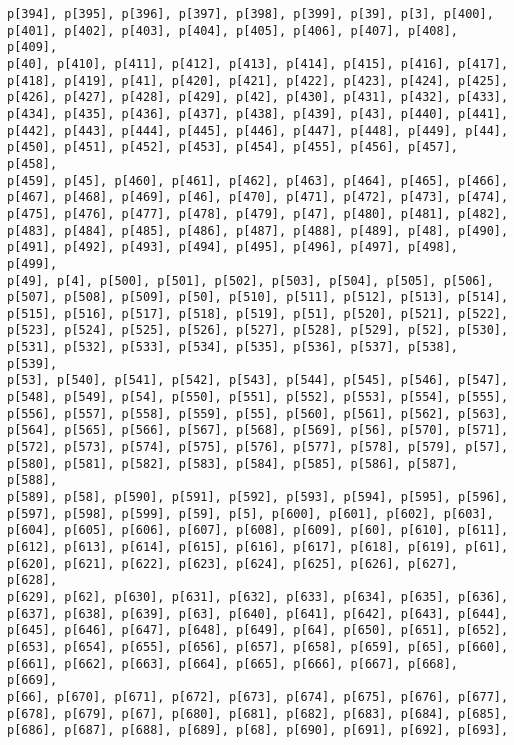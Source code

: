 \documentclass[
  letterpaper,
  DIV=11,
  numbers=noendperiod]{scrartcl}
\begin{document}
\begin{verbatim}
p[394], p[395], p[396], p[397], p[398], p[399], p[39], p[3], p[400],
p[401], p[402], p[403], p[404], p[405], p[406], p[407], p[408], p[409],
p[40], p[410], p[411], p[412], p[413], p[414], p[415], p[416], p[417],
p[418], p[419], p[41], p[420], p[421], p[422], p[423], p[424], p[425],
p[426], p[427], p[428], p[429], p[42], p[430], p[431], p[432], p[433],
p[434], p[435], p[436], p[437], p[438], p[439], p[43], p[440], p[441],
p[442], p[443], p[444], p[445], p[446], p[447], p[448], p[449], p[44],
p[450], p[451], p[452], p[453], p[454], p[455], p[456], p[457], p[458],
p[459], p[45], p[460], p[461], p[462], p[463], p[464], p[465], p[466],
p[467], p[468], p[469], p[46], p[470], p[471], p[472], p[473], p[474],
p[475], p[476], p[477], p[478], p[479], p[47], p[480], p[481], p[482],
p[483], p[484], p[485], p[486], p[487], p[488], p[489], p[48], p[490],
p[491], p[492], p[493], p[494], p[495], p[496], p[497], p[498], p[499],
p[49], p[4], p[500], p[501], p[502], p[503], p[504], p[505], p[506],
p[507], p[508], p[509], p[50], p[510], p[511], p[512], p[513], p[514],
p[515], p[516], p[517], p[518], p[519], p[51], p[520], p[521], p[522],
p[523], p[524], p[525], p[526], p[527], p[528], p[529], p[52], p[530],
p[531], p[532], p[533], p[534], p[535], p[536], p[537], p[538], p[539],
p[53], p[540], p[541], p[542], p[543], p[544], p[545], p[546], p[547],
p[548], p[549], p[54], p[550], p[551], p[552], p[553], p[554], p[555],
p[556], p[557], p[558], p[559], p[55], p[560], p[561], p[562], p[563],
p[564], p[565], p[566], p[567], p[568], p[569], p[56], p[570], p[571],
p[572], p[573], p[574], p[575], p[576], p[577], p[578], p[579], p[57],
p[580], p[581], p[582], p[583], p[584], p[585], p[586], p[587], p[588],
p[589], p[58], p[590], p[591], p[592], p[593], p[594], p[595], p[596],
p[597], p[598], p[599], p[59], p[5], p[600], p[601], p[602], p[603],
p[604], p[605], p[606], p[607], p[608], p[609], p[60], p[610], p[611],
p[612], p[613], p[614], p[615], p[616], p[617], p[618], p[619], p[61],
p[620], p[621], p[622], p[623], p[624], p[625], p[626], p[627], p[628],
p[629], p[62], p[630], p[631], p[632], p[633], p[634], p[635], p[636],
p[637], p[638], p[639], p[63], p[640], p[641], p[642], p[643], p[644],
p[645], p[646], p[647], p[648], p[649], p[64], p[650], p[651], p[652],
p[653], p[654], p[655], p[656], p[657], p[658], p[659], p[65], p[660],
p[661], p[662], p[663], p[664], p[665], p[666], p[667], p[668], p[669],
p[66], p[670], p[671], p[672], p[673], p[674], p[675], p[676], p[677],
p[678], p[679], p[67], p[680], p[681], p[682], p[683], p[684], p[685],
p[686], p[687], p[688], p[689], p[68], p[690], p[691], p[692], p[693],

\end{verbatim}
\end{document}
